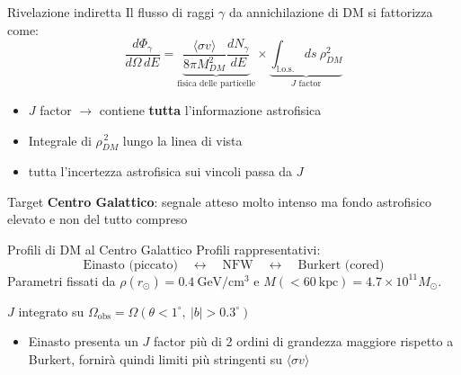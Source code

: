 \documentclass[aspectratio=169,12pt]{beamer}
\begin{document}
\begin{frame}{Rivelazione indiretta}
    \small
    Il flusso di raggi $\gamma$ da annichilazione di DM si fattorizza come:
    \[
    \frac{d\Phi_\gamma}{d\Omega\,dE}
    =
    \underbrace{\frac{\langle\sigma v\rangle}{8\pi M_{DM}^2}\frac{dN_\gamma}{dE}}_{\text{fisica delle particelle}}
    \times
    \underbrace{\int_{\text{l.o.s.}} \!\! ds\ \rho_{DM}^2}_{\displaystyle J \text{ factor}}
    \]
    \begin{itemize}
        \item $J$ factor $\longrightarrow$ contiene \textbf{tutta} l'informazione astrofisica
        \item Integrale di $\rho_{DM}^{\,2}$ lungo la linea di vista
        \item[$\Rightarrow$] tutta l'incertezza astrofisica sui vincoli passa da $J$
    \end{itemize}
    \vspace{-6pt}
    \begin{block}{Target}
        {\small\textbf{Centro Galattico}: segnale atteso molto intenso ma fondo astrofisico elevato e non del tutto compreso}
    \end{block}
\end{frame}

\begin{frame}{Profili di DM al Centro Galattico}
    \small
    Profili rappresentativi:
    \[
    \text{Einasto (piccato)} \quad\longleftrightarrow\quad \text{NFW} \quad\longleftrightarrow\quad \text{Burkert (cored)}
    \]
    Parametri fissati da $\rho(r_\odot)=0.4~\mathrm{GeV/cm^3}$ e $M(<60~\mathrm{kpc})=4.7\times10^{11}M_\odot$.
    \vspace{2pt}
    \begin{center}
    $J$ integrato su
    $\Omega_{\mathrm{obs}}=\Omega(\theta<1^\circ,\ |b|>0.3^\circ)$
    \end{center}
    \vspace{-2pt}
    \begin{table}
    \centering
    \small
    \end{table}
    \vspace{4pt}
    \begin{itemize}
        \item Einasto presenta un $J$ factor più di 2 ordini di grandezza maggiore rispetto a Burkert, 
        fornirà quindi limiti più stringenti su $\langle\sigma v\rangle$
    \end{itemize}
\end{frame}
\end{document}
